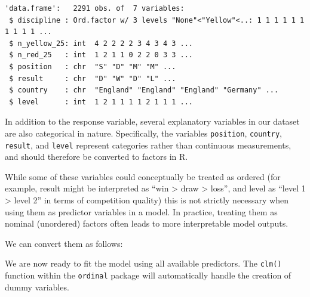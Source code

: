 \documentclass[
  letterpaper,
  DIV=11,
  numbers=noendperiod]{scrartcl}
\newenvironment{Shaded}{\begin{snugshade}}{\end{snugshade}}
\newcommand{\CommentTok}[1]{\textcolor[rgb]{0.37,0.37,0.37}{#1}}
\newcommand{\FunctionTok}[1]{\textcolor[rgb]{0.28,0.35,0.67}{#1}}
\newcommand{\NormalTok}[1]{\textcolor[rgb]{0.00,0.23,0.31}{#1}}
\newcommand{\OtherTok}[1]{\textcolor[rgb]{0.00,0.23,0.31}{#1}}
\newcommand{\SpecialCharTok}[1]{\textcolor[rgb]{0.37,0.37,0.37}{#1}}
\begin{document}
\begin{verbatim}
'data.frame':   2291 obs. of  7 variables:
 $ discipline : Ord.factor w/ 3 levels "None"<"Yellow"<..: 1 1 1 1 1 1 1 1 1 1 ...
 $ n_yellow_25: int  4 2 2 2 2 3 4 3 4 3 ...
 $ n_red_25   : int  1 2 1 1 0 2 2 0 3 3 ...
 $ position   : chr  "S" "D" "M" "M" ...
 $ result     : chr  "D" "W" "D" "L" ...
 $ country    : chr  "England" "England" "England" "Germany" ...
 $ level      : int  1 2 1 1 1 1 2 1 1 1 ...
\end{verbatim}

In addition to the response variable, several explanatory variables in
our dataset are also categorical in nature. Specifically, the variables
\texttt{position}, \texttt{country}, \texttt{result}, and \texttt{level}
represent categories rather than continuous measurements, and should
therefore be converted to factors in R.

While some of these variables could conceptually be treated as ordered
(for example, result might be interpreted as ``win \textgreater{} draw
\textgreater{} loss'', and level as ``level 1 \textgreater{} level 2''
in terms of competition quality) this is not strictly necessary when
using them as predictor variables in a model. In practice, treating them
as nominal (unordered) factors often leads to more interpretable model
outputs.

We can convert them as follows:

\begin{Shaded}
\end{Shaded}

We are now ready to fit the model using all available predictors. The
\texttt{clm()} function within the \texttt{ordinal} package will
automatically handle the creation of dummy variables.
\end{document}
